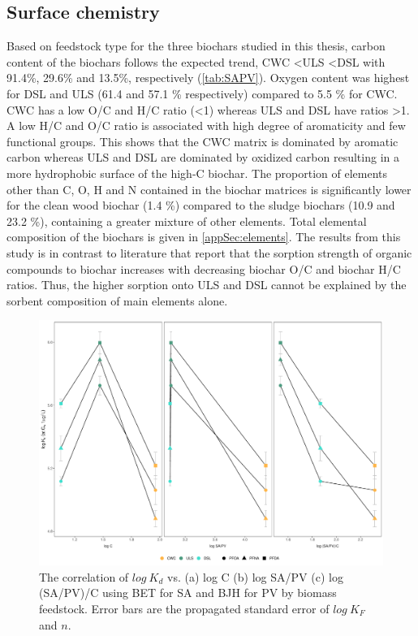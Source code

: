 \subsection{Surface chemistry}
Based on feedstock type for the three biochars studied in this thesis, carbon content of the biochars follows the expected trend, CWC \textless ULS \textless DSL with 91.4\%, 29.6\% and 13.5\%, respectively (\cref{tab:SAPV}). Oxygen content was highest for DSL and ULS (61.4 and 57.1 \% respectively) compared to 5.5 \% for CWC. CWC has a low O/C and H/C ratio (\textless 1) whereas ULS and DSL have ratios \textgreater 1. A low H/C and O/C ratio is associated with high degree of aromaticity and few functional groups. This shows that the CWC matrix is dominated by aromatic carbon whereas ULS and DSL are dominated by oxidized carbon resulting in a more hydrophobic surface of the high-C biochar. The proportion of elements other than C, O, H and N contained in the biochar matrices is significantly lower for the clean wood biochar (1.4 \%) compared to the sludge biochars (10.9 and 23.2 \%), containing a greater mixture of other elements. Total elemental composition of the biochars is given in \cref{appSec:elements}. The results from this study is in contrast to literature \citep{Hale2016,Sormo2021,zhang2021sorption} that report that the sorption strength of organic compounds to biochar increases with decreasing biochar O/C and biochar H/C ratios. Thus, the higher sorption onto ULS and DSL cannot be explained by the sorbent composition of main elements alone.

\begin{figure}[htb]
    \centering
    \includegraphics[width=\textwidth]{R/figs/SAPV_C_Kd1ugL_plot.pdf}
    \caption{The correlation of $log~K_d$ vs. (a) log C (b) log SA/PV (c) log (SA/PV)/C using BET for SA and BJH for PV by biomass feedstock. Error bars are the propagated standard error of $log~K_F$ and $n$.}
    \label{fig:Kd_SAPV_C}
\end{figure}


